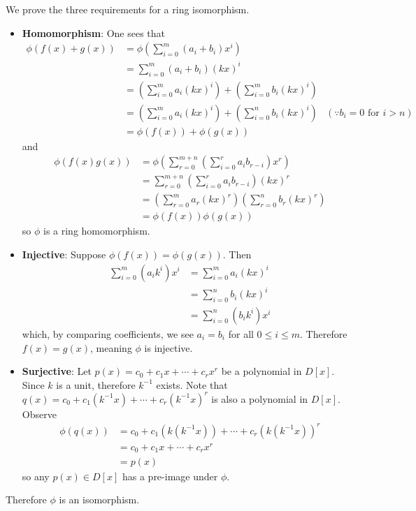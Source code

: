 \begin{questions}
    \item We prove the three requirements for a ring isomorphism.
    \begin{itemize}
        \item \textbf{Homomorphism}: One sees that
        \begin{align*}
            \phi(f(x) + g(x)) &= \phi\left(\sum_{i=0}^m(a_i+b_i)x^i\right)\\
            &= \sum_{i=0}^m(a_i+b_i)(kx)^i\\
            &= \left(\sum_{i=0}^ma_i(kx)^i\right) + \left(\sum_{i=0}^mb_i(kx)^i\right)\\
            &= \left(\sum_{i=0}^ma_i(kx)^i\right) + \left(\sum_{i=0}^nb_i(kx)^i\right) & (\because b_i = 0 \text{ for } i > n)\\
            &= \phi(f(x)) + \phi(g(x))
        \end{align*}
        and
        \begin{align*}
            \phi(f(x)g(x)) &= \phi\left(\sum_{r=0}^{m+n}\left(\sum_{i=0}^ra_ib_{r-i}\right)x^r\right)\\
            &= \sum_{r=0}^{m+n}\left(\sum_{i=0}^ra_ib_{r-i}\right)(kx)^r\\
            &= \left(\sum_{r=0}^ma_r(kx)^r\right)\left(\sum_{r=0}^nb_r(kx)^r\right)\\
            &= \phi(f(x))\phi(g(x))
        \end{align*}
        so $\phi$ is a ring homomorphism.
        
        \item \textbf{Injective}: Suppose $\phi(f(x)) = \phi(g(x))$. Then
        \begin{align*}
            \sum_{i=0}^m(a_ik^i)x^i &= \sum_{i=0}^ma_i(kx)^i\\
            &= \sum_{i=0}^nb_i(kx)^i\\
            &= \sum_{i=0}^n(b_ik^i)x^i
        \end{align*}
        which, by comparing coefficients, we see $a_i = b_i$ for all $0 \leq i \leq m$. Therefore $f(x) = g(x)$, meaning $\phi$ is injective.
        
        \item \textbf{Surjective}: Let $p(x) = c_0 + c_1x + \cdots + c_rx^r$ be a polynomial in $D[x]$. Since $k$ is a unit, therefore $k^{-1}$ exists. Note that $q(x) = c_0 + c_1(k^{-1}x) + \cdots + c_r(k^{-1}x)^r$ is also a polynomial in $D[x]$. Observe
        \begin{align*}
            \phi(q(x)) &= c_0 + c_1(k(k^{-1}x)) + \cdots + c_r(k(k^{-1}x))^r\\
            &= c_0 + c_1x + \cdots + c_rx^r\\
            &= p(x)
        \end{align*}
        so any $p(x) \in D[x]$ has a pre-image under $\phi$.
    \end{itemize}
    Therefore $\phi$ is an isomorphism.


\end{questions}

